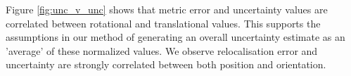 Figure \ref{fig:unc_v_unc} shows that metric error and uncertainty values are correlated between rotational and translational values. This supports the assumptions in our method of generating an overall uncertainty estimate as an 'average' of these normalized values. We observe relocalisation error and uncertainty are strongly correlated between both position and orientation.

\begin{figure}[p]
\clearpage
\begin{center}
    

\end{center}
\end{figure}
